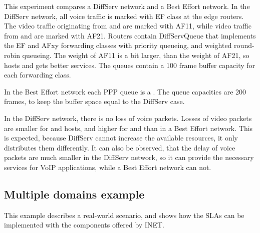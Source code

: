 This experiment compares a DiffServ network and a Best Effort network.
In the DiffServ network, all voice traffic is marked with EF class
at the edge routers. The video traffic originating from  and
 are marked with AF11, while video traffic from  and
 are marked with AF21. Routers contain DiffServQueue that
implements the EF and AFxy forwarding classes with priority queueing,
and weighted round-robin queueing. The weight of AF11 is a bit larger,
than the weight of AF21, so hosts  and  gets better
services. The queues contain a 100 frame buffer capacity for each forwarding
class.

In the Best Effort network each PPP queue is a .
The queue capacities are 200 frames, to keep the buffer space equal to
the DiffServ case.

In the DiffServ network, there is no loss of voice packets. Losses
of video packets are smaller for  and  hosts, and
higher for  and  than in a Best Effort network.
This is expected, because DiffServ cannot increase the available
resources, it only distributes them differently. It can also be
observed, that the delay of voice packets are much smaller in the
DiffServ network, so it can provide the necessary services for
VoIP applications, while a Best Effort network can not.

\subsection*{Multiple domains example}

This example describes a real-world scenario, and shows how
the SLAs can be implemented with the components offered by INET.
